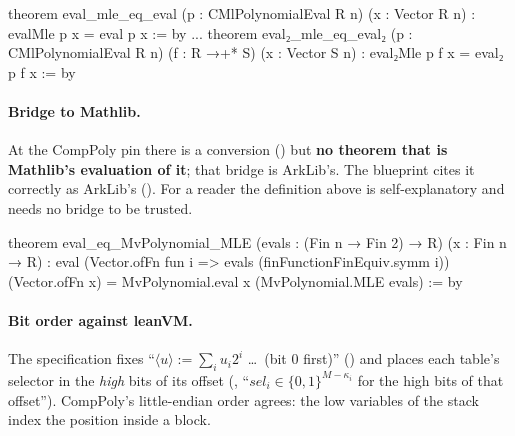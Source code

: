 

\begin{leancode}
theorem eval_mle_eq_eval (p : CMlPolynomialEval R n) (x : Vector R n) :
    evalMle p x = eval p x := by
...
theorem eval₂_mle_eq_eval₂ (p : CMlPolynomialEval R n) (f : R →+* S) (x : Vector S n) :
    eval₂Mle p f x = eval₂ p f x := by
\end{leancode}


\paragraph{Bridge to Mathlib.} At the CompPoly pin there is a conversion
\allowbreak{} (\allowbreak{}) but \textbf{no theorem
that  is Mathlib's evaluation of it}; that bridge is ArkLib's. The blueprint cites it
correctly as ArkLib's (). For a reader the definition 
above is self-explanatory and needs no bridge to be trusted.

\begin{leancode}
theorem eval_eq_MvPolynomial_MLE (evals : (Fin n → Fin 2) → R) (x : Fin n → R) :
    eval
        (Vector.ofFn fun i => evals (finFunctionFinEquiv.symm i))
        (Vector.ofFn x) =
      MvPolynomial.eval x (MvPolynomial.MLE evals) := by
\end{leancode}


\paragraph{Bit order against leanVM.} The specification fixes \enquote{$\langle u\rangle :=
\sum_i u_i 2^i$ \dots\ (bit $0$ first)} (\allowbreak{}\allowbreak{}\allowbreak{})
and places each table's selector in the \emph{high} bits of its offset
(, \enquote{$\mathit{sel}_i \in \{0,1\}^{M-\kappa_i}$ for
the high bits of that offset}). CompPoly's little-endian order agrees: the low variables of the
stack index the position inside a block.

